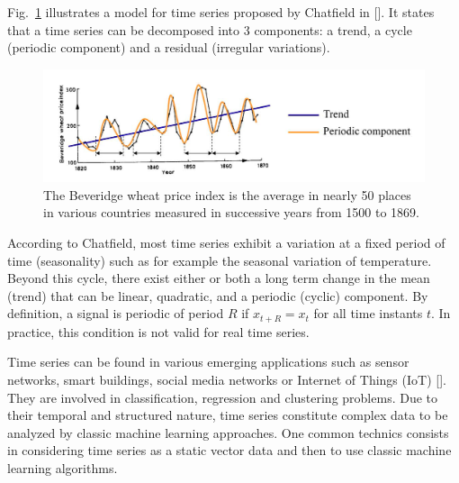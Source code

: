 Fig.~\ref{fig:time_series_example} illustrates a model for time series proposed by Chatfield in [\cite{Chatfield2004a}]. It states that a time series can be decomposed into 3 components: a trend, a cycle (periodic component) and a residual (irregular variations). 

\begin{figure}[h!]
\centering
\includegraphics[width=1\linewidth]{images/time_series_example}
\caption{The Beveridge wheat price index is the average in nearly 50 places in various countries measured in successive years from 1500 to 1869. \protect\footnotemark}
\label{fig:time_series_example}
\end{figure}

\noindent According to Chatfield, most time series exhibit a variation at a fixed period of time (seasonality) such as for example the seasonal variation of temperature. Beyond this cycle, there exist either or both a long term change in the mean (trend) that can be linear, quadratic, and a periodic (cyclic) component. By definition, a signal is periodic of period $R$ if $x_{t+R}=x_t$ for all time instants $t$. In practice, this condition is not valid for real time series.

Time series can be found in various emerging applications such as sensor networks, smart buildings, social media networks or Internet of Things (IoT) [\cite{Najmeddine2012,Nguyen2012,Yin2008}]. They are involved in classification, regression and clustering problems. Due to their temporal and structured nature, time series constitute complex data to be analyzed by classic machine learning approaches. One common technics consists in considering time series as a static vector data and then to use classic machine learning algorithms.




